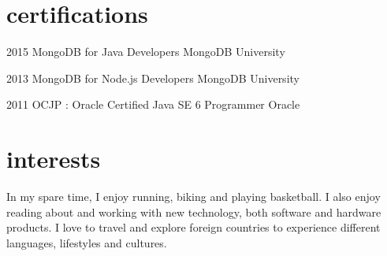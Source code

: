 \documentclass[]{friggeri-cv} %
\begin{document}
\section{certifications}

\begin{entrylist}


\entry
{2015}
{MongoDB for Java Developers}
{MongoDB University}
{}
{}

\entry
{2013}
{MongoDB for Node.js Developers}
{MongoDB University}
{}
{}

\entry
{2011}
{OCJP : Oracle Certified Java SE 6 Programmer}
{Oracle}
{}
{}


\end{entrylist}


\section{interests}

In my spare time, I enjoy running, biking and playing basketball. I also enjoy reading about and working
with new technology, both software and hardware products. I love to travel and explore foreign countries to experience different languages, lifestyles and cultures.
\end{document}
